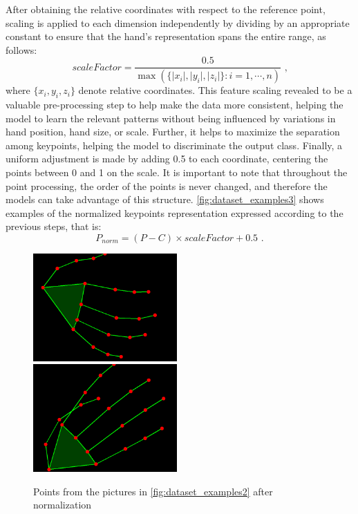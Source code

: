 After obtaining the relative coordinates with respect to the reference point, scaling is applied to each dimension independently by dividing by an appropriate constant to ensure that the hand’s representation spans the entire range, as follows:
\begin{equation}
scaleFactor = \frac {0.5}{\max(\{\lvert x_i \rvert,\lvert y_i \rvert,\lvert z_i\rvert\}: i=1,\cdots,n)} \text{  ,}
\end{equation}
%
where $\{x_i,y_i,z_i\}$ denote relative coordinates. This feature scaling revealed to be a valuable pre-processing step to help make the data more consistent, helping the model to learn the relevant patterns without being influenced by variations in hand position, hand size, or scale. Further, it helps to maximize the separation among keypoints, helping the model to discriminate the output class. Finally, a uniform adjustment is made by adding 0.5 to each coordinate, centering the points between 0 and 1 on the scale. It is important to note that throughout the point processing, the order of the points is never changed, and therefore the models can take advantage of this structure. \autoref{fig:dataset_examples3} shows examples of the normalized keypoints representation expressed according to the previous steps, that is: 
\begin{equation}
P_{norm} = (P - C) \times scaleFactor + 0.5\text{ .}
\end{equation}

\begin{figure}[ht]
    \centerline{\includegraphics[width=0.49\textwidth]{figs/dataset_preprocessing3_1.png} \ \includegraphics[width=0.49\textwidth]{figs/dataset_preprocessing3_2.png}}
    \caption{Points from the pictures in \autoref{fig:dataset_examples2} after normalization}
    \label{fig:dataset_examples3}
\end{figure}

